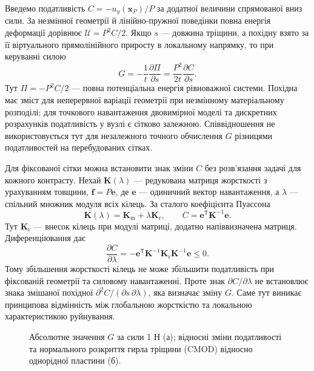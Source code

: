Введемо податливість $C=-u_y(\boldsymbol x_P)/P$ за додатної величини спрямованої вниз сили. За незмінної геометрії й лінійно-пружної поведінки повна енергія деформації дорівнює $\mathcal U=P^2C/2$. Якщо $s$ --- довжина тріщини, а похідну взято за її віртуального прямолінійного приросту в локальному напрямку, то при керуванні силою
\begin{equation}
 G=-\frac{1}{t}\frac{\partial\Pi}{\partial s}
 =\frac{P^2}{2t}\frac{\partial C}{\partial s}.
 \label{eq:fixed-compliance-G}
\end{equation}
Тут $\Pi=-P^2C/2$ --- повна потенціальна енергія рівноважної системи. Похідна має зміст для неперервної варіації геометрії при незмінному матеріальному розподілі; для точкового навантаження двовимірної моделі та дискретних розрахунків податливість у вузлі є сітково залежною. Співвідношення не використовується тут для незалежного точного обчислення $G$ різницями податливостей на перебудованих сітках.

Для фіксованої сітки можна встановити знак зміни $C$ без розв'язання задачі для кожного контрасту. Нехай $\boldsymbol K(\lambda)$ --- редукована матриця жорсткості з урахуванням товщини, $\boldsymbol f=P\boldsymbol e$, де $\boldsymbol e$ --- одиничний вектор навантаження, а $\lambda$ --- спільний множник модуля всіх кілець. За сталого коефіцієнта Пуассона
\begin{equation}
 \boldsymbol K(\lambda)=\boldsymbol K_{\mathrm m}
 +\lambda\boldsymbol K_{\mathrm r},\qquad
 C=\boldsymbol e^{\mathsf T}\boldsymbol K^{-1}\boldsymbol e.
 \label{eq:fixed-K-compliance}
\end{equation}
Тут $\boldsymbol K_{\mathrm r}$ --- внесок кілець при модулі матриці, додатно напіввизначена матриця. Диференціювання дає
\begin{equation}
 \frac{\partial C}{\partial\lambda}
 =-\boldsymbol e^{\mathsf T}\boldsymbol K^{-1}
 \boldsymbol K_{\mathrm r}\boldsymbol K^{-1}\boldsymbol e
 \le 0.
 \label{eq:fixed-C-monotonicity}
\end{equation}
Тому збільшення жорсткості кілець не може збільшити податливість при фіксованій геометрії та силовому навантаженні. Проте знак $\partial C/\partial\lambda$ не встановлює знака змішаної похідної $\partial^2 C/(\partial s\,\partial\lambda)$, яка визначає зміну $G$. Саме тут виникає принципова відмінність між глобальною жорсткістю та локальною характеристикою руйнування.

\begin{figure}[htbp]
 \centering
 
 \caption{Абсолютне значення $G$ за сили 1 Н (а); відносні зміни податливості та нормального розкриття гирла тріщини (CMOD) відносно однорідної пластини (б).}
 \label{fig:fixed-structure}
\end{figure}

